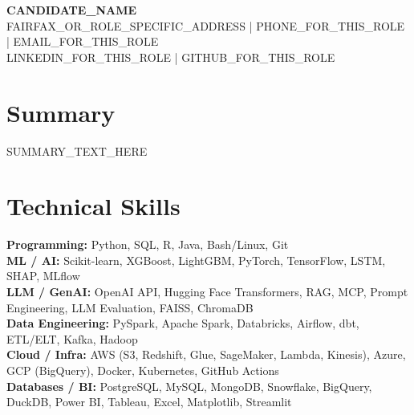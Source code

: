 \documentclass[letterpaper,9pt]{article}
\begin{document}

	\begin{center}
		{\Large \textbf{CANDIDATE_NAME}} \\
		FAIRFAX_OR_ROLE_SPECIFIC_ADDRESS \;|\; PHONE_FOR_THIS_ROLE \;|\; EMAIL_FOR_THIS_ROLE \\
		LINKEDIN_FOR_THIS_ROLE \;|\; GITHUB_FOR_THIS_ROLE
	\end{center}


	\section*{Summary}
	SUMMARY_TEXT_HERE


	\section*{Technical Skills}
	\textbf{Programming:} Python, SQL, R, Java, Bash/Linux, Git \\
	\textbf{ML / AI:} Scikit-learn, XGBoost, LightGBM, PyTorch, TensorFlow, LSTM, SHAP, MLflow \\
	\textbf{LLM / GenAI:} OpenAI API, Hugging Face Transformers, RAG, MCP, Prompt Engineering, LLM Evaluation, FAISS, ChromaDB \\
	\textbf{Data Engineering:} PySpark, Apache Spark, Databricks, Airflow, dbt, ETL/ELT, Kafka, Hadoop \\
	\textbf{Cloud / Infra:} AWS (S3, Redshift, Glue, SageMaker, Lambda, Kinesis), Azure, GCP (BigQuery), Docker, Kubernetes, GitHub Actions \\
	\textbf{Databases / BI:} PostgreSQL, MySQL, MongoDB, Snowflake, BigQuery, DuckDB, Power BI, Tableau, Excel, Matplotlib, Streamlit

\end{document}

